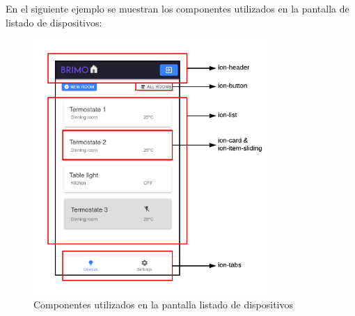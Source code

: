 \newpage
En el siguiente ejemplo se muestran los componentes utilizados en la pantalla de listado de dispositivos:
\begin{figure}[H]
\centering
\includegraphics[width=3.50in]{images/ion_components.png}
\caption{Componentes utilizados en la pantalla listado de dispositivos}
\label{fig:ion_components}
\end{figure}

